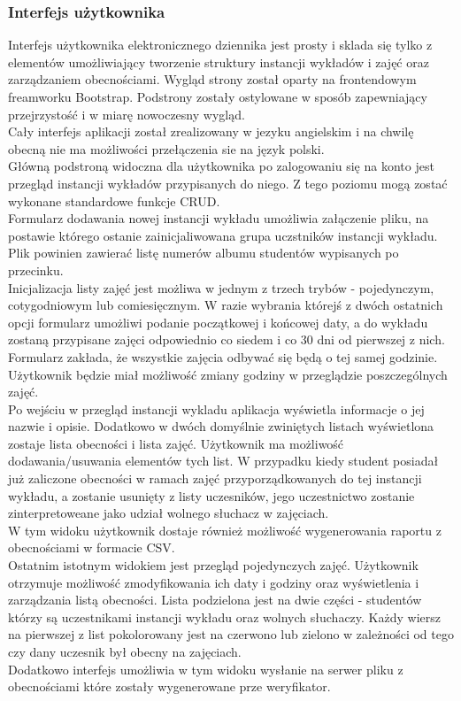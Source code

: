 \documentclass[declaration,shortabstract, mgr]{iithesis}
\begin{document}
\subsubsection{Interfejs użytkownika}
\indent Interfejs użytkownika elektronicznego dziennika jest prosty i sklada się tylko z elementów umożliwiający tworzenie struktury instancji wykładów i zajęć oraz zarządzaniem obecnościami. Wygląd strony został oparty na frontendowym freamworku Bootstrap\cite{bootstrap}. 
Podstrony zostały ostylowane w sposób zapewniający przejrzystość i w miarę nowoczesny wygląd. \\
\indent Cały interfejs aplikacji został zrealizowany w jezyku angielskim i na chwilę obecną nie ma możliwości przełączenia sie na język polski.\\
\indent Główną podstroną widoczna dla użytkownika po zalogowaniu się na konto jest przegląd instancji wykładów przypisanych do niego. Z tego poziomu mogą zostać wykonane standardowe funkcje CRUD\cite{crud}.\\
\indent Formularz dodawania nowej instancji wykładu umożliwia załączenie pliku, na postawie którego ostanie zainicjaliwowana grupa uczstników instancji wykładu. Plik powinien zawierać listę numerów albumu studentów wypisanych po przecinku.\\
\indent Inicjalizacja listy zajęć jest możliwa w jednym z trzech trybów - pojedynczym, cotygodniowym lub comiesięcznym. W razie wybrania którejś z dwóch ostatnich opcji formularz umożliwi podanie początkowej i końcowej daty, a do wykładu zostaną przypisane zajęci odpowiednio co siedem i co 30 dni od pierwszej z nich. Formularz zakłada, że wszystkie zajęcia odbywać się będą o tej samej godzinie. Użytkownik będzie miał możliwość zmiany godziny w przeglądzie poszczególnych zajęć.\\
\indent Po wejściu w przegląd instancji wykladu aplikacja wyświetla informacje o jej nazwie i opisie. Dodatkowo w dwóch domyślnie zwiniętych listach wyświetlona zostaje lista obecności i lista zajęć. Użytkownik ma możliwość dodawania/usuwania elementów tych list. W przypadku kiedy student posiadał już zaliczone obecności w ramach zajęć przyporządkowanych do tej instancji wykładu, a zostanie usunięty z listy uczesników, jego uczestnictwo zostanie zinterpretoweane jako udział wolnego słuchacz w zajęciach.\\
\indent W tym widoku użytkownik dostaje również możliwość wygenerowania raportu z obecnościami w formacie CSV.\\
\indent Ostatnim istotnym widokiem jest przegląd pojedynczych zajęć. Użytkownik otrzymuje możliwość zmodyfikowania ich daty i godziny oraz wyświetlenia i zarządzania listą obecności. Lista podzielona jest na dwie części - studentów którzy są uczestnikami instancji wykładu oraz wolnych słuchaczy. Każdy wiersz na pierwszej z list pokolorowany jest na czerwono lub zielono w zależności od tego czy dany uczesnik był obecny na zajęciach. \\
\indent Dodatkowo interfejs umożliwia w tym widoku wysłanie na serwer pliku z obecnościami które zostały wygenerowane prze weryfikator.\\
\end{document}

